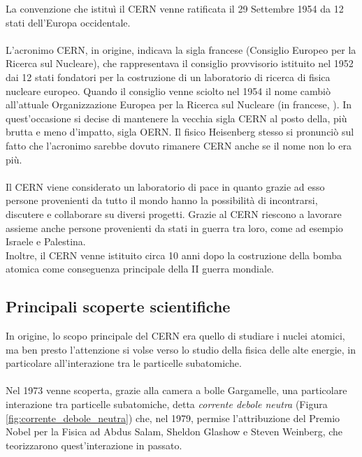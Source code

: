 		La convenzione che istituì il \ac{CERN} venne ratificata il 29 Settembre 1954 da 12 stati dell'Europa occidentale.\\
		\\
		L'acronimo \ac{CERN}, in origine, indicava la sigla francese \emph{} (Consiglio Europeo per la Ricerca sul Nucleare), che rappresentava il consiglio provvisorio istituito nel 1952 dai 12 stati fondatori per la costruzione di un laboratorio di ricerca di fisica nucleare europeo. Quando il consiglio venne sciolto nel 1954 il nome cambiò all'attuale Organizzazione Europea per la Ricerca sul Nucleare (in francese, \emph{}). In quest'occasione si decise di mantenere la vecchia sigla \ac{CERN} al posto della, più brutta e meno d'impatto, sigla \ac{OERN}. Il fisico Heisenberg stesso si pronunciò sul fatto che l'acronimo sarebbe dovuto rimanere \ac{CERN} anche se il nome non lo era più.\\
		\\
		Il \ac{CERN} viene considerato un laboratorio di pace in quanto grazie ad esso persone provenienti da tutto il mondo hanno la possibilità di incontrarsi, discutere e collaborare su diversi progetti. Grazie al \ac{CERN} riescono a lavorare assieme anche persone provenienti da stati in guerra tra loro, come ad esempio Israele e Palestina.\\
		Inoltre, il \ac{CERN} venne istituito circa 10 anni dopo la costruzione della bomba atomica come conseguenza principale della II guerra mondiale.
		
		\subsection{Principali scoperte scientifiche} \label{subsec:CERN;storia;principali_scoperte_scientifiche}
		
			In origine, lo scopo principale del \ac{CERN} era quello di studiare i nuclei atomici, ma ben presto l'attenzione si volse verso lo studio della fisica delle alte energie, in particolare all'interazione tra le particelle subatomiche.\\
			\\
			Nel 1973 venne scoperta, grazie alla camera a bolle Gargamelle, una particolare interazione tra particelle subatomiche, detta \textit{corrente debole neutra} (Figura \ref{fig:corrente_debole_neutra}) che, nel 1979, permise l'attribuzione del Premio Nobel per la Fisica ad Abdus Salam, Sheldon Glashow e Steven Weinberg, che teorizzarono quest'interazione in passato.\\
			
